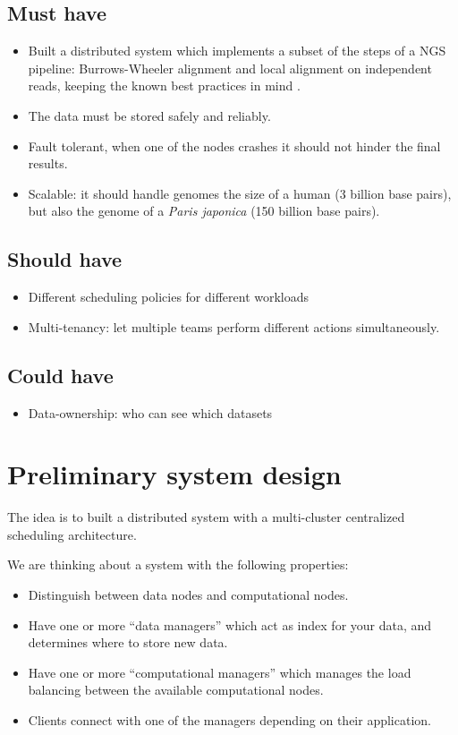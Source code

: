 \documentclass[a4paper,article,oneside]{memoir}
\begin{document}
\section{Must have}

\begin{itemize}
    \item Built a distributed system which implements a subset of the steps of a NGS pipeline: Burrows-Wheeler alignment and local alignment on independent reads, keeping the known best practices in mind \cite{auwera2013fastq}.
    \item The data must be stored safely and reliably.
    \item Fault tolerant, when one of the nodes crashes it should not hinder the final results.
    \item Scalable: it should handle genomes the size of a human (3 billion base pairs), but also the genome of a \textit{Paris japonica} (150 billion base pairs).
\end{itemize}

\section{Should have}

\begin{itemize}
    \item Different scheduling policies for different workloads
    \item Multi-tenancy: let multiple teams perform different actions simultaneously.
\end{itemize}

\section{Could have}

\begin{itemize}
    \item Data-ownership: who can see which datasets
\end{itemize}

\chapter{Preliminary system design}

The idea is to built a distributed system with a multi-cluster centralized scheduling architecture. 

We are thinking about a system with the following properties:

\begin{itemize}
    \item Distinguish between data nodes and computational nodes.
    \item Have one or more ``data managers'' which act as index for your data, and determines where to store new data. 
    \item Have one or more ``computational managers'' which manages the load balancing between the available computational nodes.
    \item Clients connect with one of the managers depending on their application.
\end{itemize}



\end{document}
